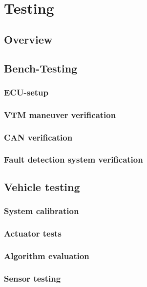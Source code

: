 \documentclass[ExampleMasters.tex]{subfiles}
\begin{document}
\clearpage
\chapter{Testing}
\label{chap:testing}

\section{Overview}



\section{Bench-Testing}
\label{sec:bench-testing}
\subsection{ECU-setup}
\subsection{VTM maneuver verification}
\subsection{CAN verification}
\subsection{Fault detection system verification}



\section{Vehicle testing}
\label{sec:vehicle-testing}

\subsection{System calibration}
\subsection{Actuator tests}
\subsection{Algorithm evaluation}
\subsection{Sensor testing}
\end{document}
